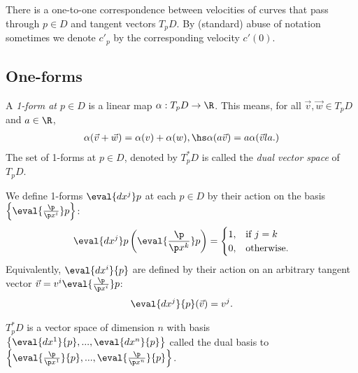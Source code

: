 \documentclass{article}
\begin{document}
\begin{corollary}
    There is a one-to-one correspondence between velocities of curves that pass through 
    $p\in D$ and tangent vectors $T_pD$. By (standard) abuse of notation sometimes 
    we denote $c'_p$ by the corresponding velocity $c'(0)$.
\end{corollary}

\subsection{One-forms}

\begin{definition}
    A \emph{1-form at $p\in D$} is a linear map $\alpha:T_pD \to \R$. This means, for all
    $\vec v, \vec w\in T_pD$ and $a\in\R$,
    \begin{align*}
        \alpha(\vec v + \vec w) = \alpha(v) + \alpha(w),\hs \alpha(a\vec v) = a\alpha(\vec v    la.)
    \end{align*}
    The set of 1-forms at $p\in D$, denoted by $T^*_p D$ is called the \emph{dual vector space}
    of $T_p D$.
\end{definition}

\begin{definition}
    We define 1-forms $\eval{dx^j}p$ at each $p\in D$ by their action on the basis
    $\left\lbrace\eval{\frac{\p }{\p x^i}}p\right\rbrace$:
    \begin{align*}
        \eval{dx^j}p\left(\eval{\frac{\p }{\p x^k}}p\right)= \begin{cases}
            1, &\text{if } j = k\\
            0, &\text{otherwise}.
        \end{cases}
    \end{align*}
    Equivalently, $\eval{dx^i}{p}$ are defined by their action on an arbitrary tangent vector
    $\vec v = v^i\eval{\frac{\p }{\p x^i}}p$:
    \begin{align*}
        \eval{dx^j}{p}(\vec v) = v^j.
    \end{align*}
\end{definition}

\begin{lemma}
    $T_p^*D$ is a vector space of dimension $n$ with basis 
    $\left\lbrace \eval{dx^1}{p},...,\eval{dx^n}{p}\right\rbrace$ called the dual basis to
    $\left\lbrace \eval{\frac{\p }{\p x^1}}{p}, ..., \eval{\frac{\p }{\p x^n}}{p}\right\rbrace$.
\end{lemma}
\end{document}
